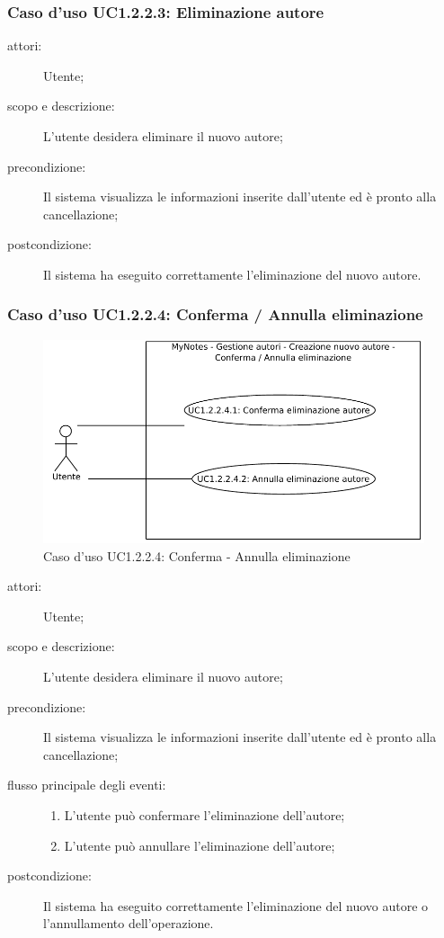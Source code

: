 \subsubsection{Caso d'uso UC1.2.2.3: Eliminazione autore}
\begin{description}
\item[attori:] Utente;
\item[scopo e descrizione:] L'utente desidera eliminare il nuovo autore;
\item[precondizione:] Il sistema visualizza le informazioni inserite dall'utente ed è pronto alla cancellazione;
\item[postcondizione:] Il sistema ha eseguito correttamente l'eliminazione del nuovo autore.
\end{description}

\subsubsection{Caso d'uso UC1.2.2.4: Conferma / Annulla eliminazione}
\begin{figure}[htb]
\centering
\includegraphics[scale=0.6]{gfx/useCase/MN_UC1-2-2-4_Conferma-Annulla_eliminazione.pdf}
\caption{Caso d'uso UC1.2.2.4: Conferma - Annulla eliminazione}
\label{fig:My notes UC1.2.2.4}
\end{figure}

\begin{description}
\item[attori:] Utente;
\item[scopo e descrizione:] L'utente desidera eliminare il nuovo autore;
\item[precondizione:] Il sistema visualizza le informazioni inserite dall'utente ed è pronto alla cancellazione;
\item[flusso principale degli eventi:] \hfill
	\begin{enumerate}
	\item L'utente può confermare l'eliminazione dell'autore;
	\item L'utente può annullare l'eliminazione dell'autore;
	\end{enumerate}
\item[postcondizione:] Il sistema ha eseguito correttamente l'eliminazione del nuovo autore o l'annullamento dell'operazione.
\end{description}

